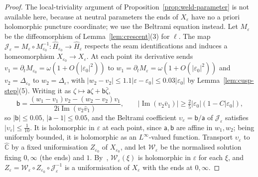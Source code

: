 \documentclass[11pt]{amsart}
\theoremstyle{definition}
\newcommand{\ii}{\mathrm{i}}
\begin{document}
\begin{proof}
The local-triviality argument of Proposition~\ref{prop:weld-parameter} is not
available here, because at neutral parameters the ends of $X_\varepsilon$ have no a
priori holomorphic puncture coordinate; we use the Beltrami equation instead.
Let $M_\varepsilon$ be the diffeomorphism of Lemma~\ref{lem:crescent}(3) for $\ell$.  The map
$\mathcal J_\varepsilon=M_\varepsilon\circ M_{\varepsilon_0}^{-1}:\hat H_{\varepsilon_0}\to\hat H_\varepsilon$ respects the seam
identifications and induces a homeomorphism $X_{\varepsilon_0}\to X_\varepsilon$.  At each point
its derivative sends $v_1=\partial_tM_{\varepsilon_0}=\omega(1+O(|\varepsilon_0|^2))$ to
$w_1=\partial_tM_\varepsilon=\omega(1+O(|\varepsilon_0|^2))$ and $v_2=\Delta_{\varepsilon_0}$ to $w_2=\Delta_\varepsilon$, with
$|w_2-v_2|\le1.1|\varepsilon-\varepsilon_0|\le0.03|\varepsilon_0|$ by Lemma~\ref{lem:cusp-step}(5).  Writing
it as $\zeta\mapsto\mathsf a\zeta+\mathsf b\bar\zeta$,
\[
 \mathsf b=\frac{(w_1-v_1)v_2-(w_2-v_2)v_1}{2\ii\operatorname{Im}(v_2\bar v_1)},\qquad
 |\operatorname{Im}(v_2\bar v_1)|\ge\tfrac25|\varepsilon_0|(1-C|\varepsilon_0|),
\]
so $|\mathsf b|\le0.05$, $|\mathsf a-1|\le0.05$, and the Beltrami coefficient
$\upsilon_\varepsilon=\mathsf b/\mathsf a$ of $\mathcal J_\varepsilon$ satisfies $|\upsilon_\varepsilon|\le\tfrac1{10}$.  It is holomorphic in $\varepsilon$ at
each point, since $\mathsf a,\mathsf b$ are affine in $w_1,w_2$; being uniformly bounded,
it is holomorphic as an $L^\infty$-valued function.  Transport $\upsilon_\varepsilon$ to $\hat{\mathbb C}$
by a fixed uniformisation $Z_{\varepsilon_0}$ of $X_{\varepsilon_0}$, and let $\mathcal W_\varepsilon$ be the normalised
solution fixing $0,\infty$ (the ends) and $1$.  By~\cite[Thm.~11]{AhlforsBers1960},
$\mathcal W_\varepsilon(\xi)$ is holomorphic in $\varepsilon$ for each $\xi$, and
$Z_\varepsilon=\mathcal W_\varepsilon\circ Z_{\varepsilon_0}\circ\mathcal J_\varepsilon^{-1}$ is a uniformisation of $X_\varepsilon$ with the
ends at $0,\infty$.


\end{proof}
\end{document}

